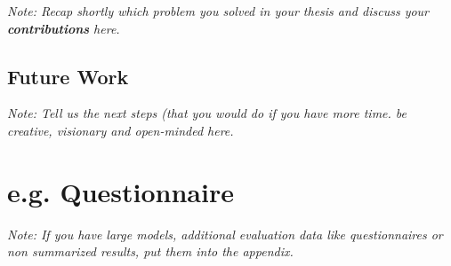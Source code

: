 \documentclass[a4paper,12pt,twoside]{report}
\begin{document}
\textit{Note: Recap shortly which problem you solved in your thesis and discuss your \textbf{contributions} here.}

\section{Future Work}

\textit{Note: Tell us the next steps  (that you would do if you have more time. be creative, visionary and open-minded here.}



\appendix

\chapter{e.g. Questionnaire}

\textit{Note: If you have large models, additional evaluation data like questionnaires or non summarized results, put them into the appendix.}


\clearpage

\listoffigures
\clearpage

\listoftables
\clearpage



\end{document}
